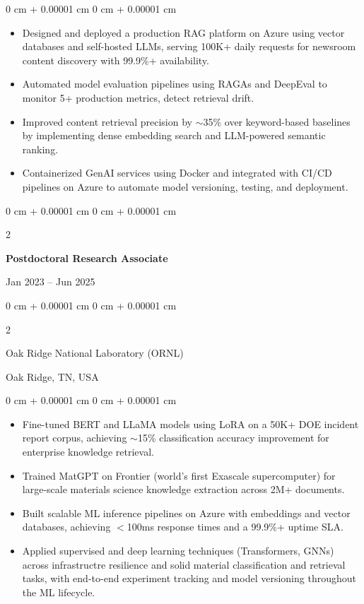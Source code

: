 \documentclass[10pt, letterpaper]{article}
\newenvironment{highlights}{
    \begin{itemize}[
        topsep=0.10 cm,
        parsep=0.10 cm,
        partopsep=0pt,
        itemsep=0pt,
        leftmargin=0 cm + 10pt
    ]
}{
    \end{itemize}
} %
\newenvironment{onecolentry}{
    \begin{adjustwidth}{
        0 cm + 0.00001 cm
    }{
        0 cm + 0.00001 cm
    }
}{
    \end{adjustwidth}
} %
\newenvironment{twocolentry}[2][]{
    \onecolentry
    \def\secondColumn{#2}
    \setcolumnwidth{\fill, 4.5 cm}
    \begin{paracol}{2}
}{
    \switchcolumn \raggedleft \secondColumn
    \end{paracol}
    \endonecolentry
} %
\begin{document}
    \begin{onecolentry}
        \begin{highlights}
            \item Designed and deployed a production RAG platform on Azure using vector databases and self-hosted LLMs, serving 100K+ daily requests for newsroom content discovery with 99.9\%+ availability.
            \item Automated model evaluation pipelines using RAGAs and DeepEval to monitor 5+ production metrics, detect retrieval drift.
            \item Improved content retrieval precision by $\sim$35\% over keyword-based baselines by implementing dense embedding search and LLM-powered semantic ranking.
            \item Containerized GenAI services using Docker and integrated with CI/CD pipelines on Azure to automate model versioning, testing, and deployment.
        \end{highlights}
    \end{onecolentry}

\vspace{1mm}

    \begin{twocolentry}{Jan 2023 -- Jun 2025}
        \textbf{Postdoctoral Research Associate}
    \end{twocolentry}
    \begin{twocolentry}{Oak Ridge, TN, USA}
        Oak Ridge National Laboratory (ORNL)
    \end{twocolentry}
    \vspace{0.10 cm}
    \begin{onecolentry}
        \begin{highlights}
            \item Fine-tuned BERT and LLaMA models using LoRA on a 50K+ DOE incident report corpus, achieving $\sim$15\% classification accuracy improvement for enterprise knowledge retrieval.
            \item Trained MatGPT on Frontier (world's first Exascale supercomputer) for large-scale materials science knowledge extraction across 2M+ documents.
            \item Built scalable ML inference pipelines on Azure with embeddings and vector databases, achieving $<$100ms response times and a 99.9\%+ uptime SLA.
            \item Applied supervised and deep learning techniques (Transformers, GNNs) across infrastructre resilience and solid material classification and retrieval tasks, with end-to-end experiment tracking and model versioning throughout the ML lifecycle.
        \end{highlights}
    \end{onecolentry}
\end{document}
